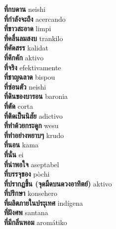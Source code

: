 \textbf{ ที่กบดาน  } neishi \\
\textbf{ ที่กำลังจะถึง  } acercando \\
\textbf{ ที่ขาวสะอาด  } limpi \\
\textbf{ ที่คลื่นลมสงบ  } trankilo \\
\textbf{ ที่คัดสรร  } kalidat \\
\textbf{ ที่คึกคัก  } aktivo \\
\textbf{ ที่จริง  } efektivamente \\
\textbf{ ที่ชาญฉลาด  } bispou \\
\textbf{ ที่ซ่อนตัว  } neishi \\
\textbf{ ที่ดินของบารอน  } baronia \\
\textbf{ ที่ตัด  } corta \\
\textbf{ ที่ติดเป็นนิสัย  } adictivo \\
\textbf{ ที่ทำด้วยกระดูก  } wesu \\
\textbf{ ที่ทำอย่างหยาบๆ  } krudo \\
\textbf{ ที่นอน  } kama \\
\textbf{ ที่นั่น  } ei \\
\textbf{ ที่น่าพอใจ  } aseptabel \\
\textbf{ ที่บรรจุของ  } pòchi \\
\textbf{ ที่ปรากฏขึ้น (จุดมืดบนดวงอาทิตย์)  } aktivo \\
\textbf{ ที่ปรึกษา  } konsehero \\
\textbf{ ที่ผลิตภายในประุเทศ  } indígena \\
\textbf{ ที่ฝังศพ  } santana \\
\textbf{ ที่มีกลิ่นหอม  } aromátiko \\
